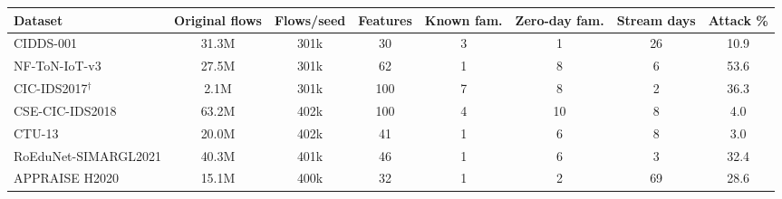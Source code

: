 \begin{tabular}{lccccccc}
\toprule
Dataset & Original flows & Flows/seed & Features & Known fam. & Zero-day fam. & Stream days & Attack \%\\
\midrule
CIDDS-001 & 31.3M & 301k & 30 & 3 & 1 & 26 & 10.9\\
NF-ToN-IoT-v3 & 27.5M & 301k & 62 & 1 & 8 & 6 & 53.6\\
CIC-IDS2017$^\dagger$ & 2.1M & 301k & 100 & 7 & 8 & 2 & 36.3\\
CSE-CIC-IDS2018 & 63.2M & 402k & 100 & 4 & 10 & 8 & 4.0\\
\midrule
CTU-13 & 20.0M & 402k & 41 & 1 & 6 & 8 & 3.0\\
RoEduNet-SIMARGL2021 & 40.3M & 401k & 46 & 1 & 6 & 3 & 32.4\\
APPRAISE H2020 & 15.1M & 400k & 32 & 1 & 2 & 69 & 28.6\\
\bottomrule
\end{tabular}
